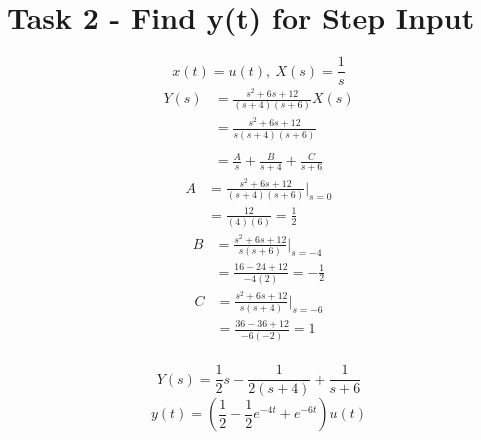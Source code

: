 \documentclass[12pt]{report}
\begin{document}
\section{Task 2 - Find y(t) for Step Input}

\begin{equation*}
	x(t) = u(t),\  X(s) = \frac{1}{s}
\end{equation*}
\begin{align*}
	Y(s) &= \frac{s^2 + 6s + 12}{(s + 4)(s + 6)}X(s) \\
	&= \frac{s^2 + 6s + 12}{s(s + 4)(s + 6)} \\ \\
	&= \frac{A}{s} + \frac{B}{s + 4} + \frac{C}{s + 6}
\end{align*}
\begin{align*}
	A &= \frac{s^2 + 6s + 12}{(s + 4)(s + 6)}|_{s = 0} \\
	&= \frac{12}{(4)(6)} = \frac{1}{2}
\end{align*}
\begin{align*}
	B &= \frac{s^2 + 6s + 12}{s(s + 6)}|_{s = -4} \\
	&= \frac{16 - 24 + 12}{-4(2)} = -\frac{1}{2}
\end{align*}
\begin{align*}
	C &= \frac{s^2 + 6s + 12}{s(s + 4)}|_{s = -6} \\
	&= \frac{36 - 36 + 12}{-6(-2)} = 1
\end{align*} \\
\begin{equation*}
	Y(s) = \frac{1}{2}s - \frac{1}{2(s + 4)} + \frac{1}{s + 6}
\end{equation*}
\begin{equation*}
	y(t) = (\frac{1}{2} - \frac{1}{2}e^{-4t} + e^{-6t})u(t)
\end{equation*}
\end{document}
